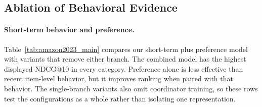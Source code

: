\documentclass[11pt]{article}
\begin{document}
\begin{table}[t]
    \centering
    \caption{Adding an item-level long-horizon encoder ($L$) to the short-term plus preference model. Both configurations retain graph features and catalog priors, and the preference encoder reads the full observed history. NDCG@10 decreases with $L$ in all four recorded categories. The comparison also changes model capacity and optimization, so it does not isolate a causal effect of long-term item-level memory.}
    \label{tab:long_addition}
    \setlength{\tabcolsep}{3.2pt}
    \renewcommand{\arraystretch}{1.12}
\end{table}


\subsection{Ablation of Behavioral Evidence}
\paragraph{Short-term behavior and preference.}
Table~\ref{tab:amazon2023_main} compares our short-term plus preference model with variants that remove either branch. The combined model has the highest displayed NDCG@10 in every category. Preference alone is less effective than recent item-level behavior, but it improves ranking when paired with that behavior. The single-branch variants also omit coordinator training, so these rows test the configurations as a whole rather than isolating one representation.
\end{document}
